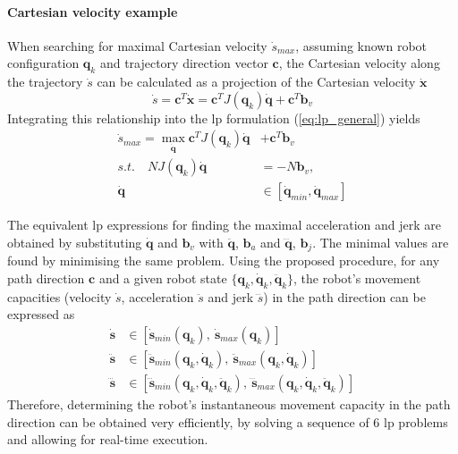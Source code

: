 \paragraph*{Cartesian velocity example} When searching for maximal Cartesian velocity $\dot{s}_{max}$, assuming known robot configuration $\bm{q}_k$ and trajectory direction vector $\bm{c}$, the Cartesian velocity along the trajectory $\dot{s}$ can be calculated as a projection of the Cartesian velocity $\dot{\bm{x}}$ 
\begin{equation}
    \dot{s} = \bm{c}^T\dot{\bm{x}}= \bm{c}^TJ(\bm{q}_k)\dot{\bm{q}} + \bm{c}^T\bm{b}_v
\end{equation}
Integrating this relationship into the \gls{lp} formulation (\ref{eq:lp_general}) yields 
\begin{equation}
\begin{split}
    \dot{s}_{max} = \max_{\dot{\bm{q}}} \bm{c}^TJ(\bm{q}_k)\dot{\bm{q}} &+ \bm{c}^T\bm{b}_v  \\
    s.t.\quad NJ(\bm{q}_k)\dot{\bm{q}} &= - N\bm{b}_v, \\
    \dot{\bm{q}}&\in [\dot{\bm{q}}_{min}, \dot{\bm{q}}_{max}]
\end{split}\label{eq:lp_vel_max}
\end{equation}

The equivalent \gls{lp} expressions for finding the maximal acceleration and jerk are obtained by substituting $\dot{\bm{q}}$ and $\bm{b}_v$ with $\ddot{\bm{q}}$, $\bm{b}_a$ and $\dddot{\bm{q}}$, $\bm{b}_j$. The minimal values are found by minimising the same problem.
Using the proposed procedure, for any path direction $\bm{c}$ and a given robot state $\{\bm{q}_k, \dot{\bm{q}}_k, \ddot{\bm{q}}_k\}$, the robot's movement capacities (velocity $\dot{s}$, acceleration $\ddot{s}$ and jerk $\dddot{s}$) in the path direction can be expressed as
\begin{equation}
\begin{split}
    \dot{\bm{s}} &\in [\dot{\bm{s}}_{min}(\bm{q}_k),~ \dot{\bm{s}}_{max}(\bm{q}_k) ]\\
    \ddot{\bm{s}} &\in [\ddot{\bm{s}}_{min}(\bm{q}_k, \dot{\bm{q}}_k),~ \ddot{\bm{s}}_{max}(\bm{q}_k, \dot{\bm{q}}_k) ]\\
    \dddot{\bm{s}} &\in [\dddot{\bm{s}}_{min}(\bm{q}_k, \dot{\bm{q}}_k, \ddot{\bm{q}}_k),~ \dddot{\bm{s}}_{max}(\bm{q}_k, \dot{\bm{q}}_k, \ddot{\bm{q}}_k) ]
\end{split}
\label{eq:range_in_path_direction}
\end{equation}
Therefore, determining the robot's instantaneous movement capacity in the path direction can be obtained very efficiently, by solving a sequence of 6 \gls{lp} problems and allowing for real-time execution.

